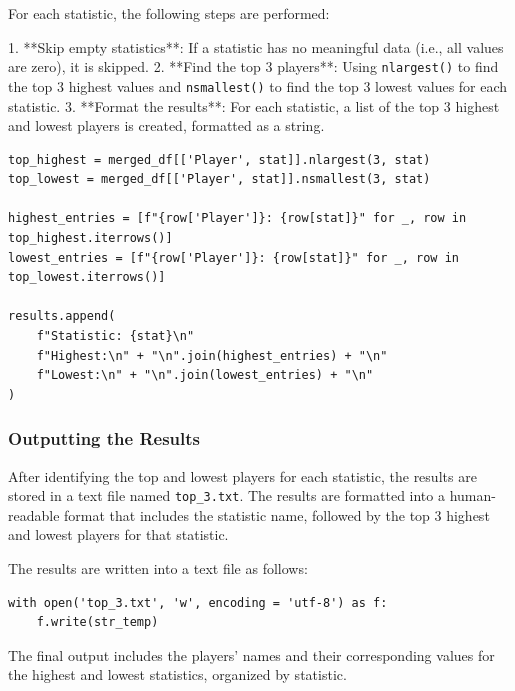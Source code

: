 \documentclass[a4paper,12pt]{article}
\begin{document}
For each statistic, the following steps are performed:

1. **Skip empty statistics**: If a statistic has no meaningful data (i.e., all values are zero), it is skipped.
2. **Find the top 3 players**: Using \texttt{nlargest()} to find the top 3 highest values and \texttt{nsmallest()} to find the top 3 lowest values for each statistic.
3. **Format the results**: For each statistic, a list of the top 3 highest and lowest players is created, formatted as a string.

\begin{verbatim}
top_highest = merged_df[['Player', stat]].nlargest(3, stat)
top_lowest = merged_df[['Player', stat]].nsmallest(3, stat)

highest_entries = [f"{row['Player']}: {row[stat]}" for _, row in top_highest.iterrows()]
lowest_entries = [f"{row['Player']}: {row[stat]}" for _, row in top_lowest.iterrows()]

results.append(
    f"Statistic: {stat}\n"
    f"Highest:\n" + "\n".join(highest_entries) + "\n"
    f"Lowest:\n" + "\n".join(lowest_entries) + "\n"
)
\end{verbatim}

\subsubsection{Outputting the Results}

After identifying the top and lowest players for each statistic, the results are stored in a text file named \texttt{top\_3.txt}. The results are formatted into a human-readable format that includes the statistic name, followed by the top 3 highest and lowest players for that statistic.

The results are written into a text file as follows:

\begin{verbatim}
with open('top_3.txt', 'w', encoding = 'utf-8') as f:
    f.write(str_temp)
\end{verbatim}

The final output includes the players' names and their corresponding values for the highest and lowest statistics, organized by statistic.
\end{document}
